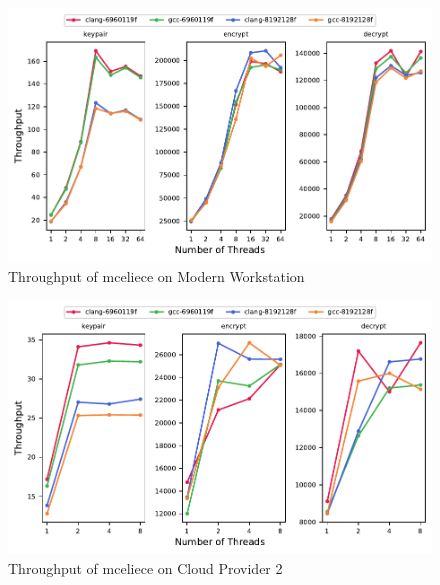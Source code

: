 \begin{figure}
    \centering
    \includegraphics[scale=0.75]{chapters/results/throughput/Modern Workstation_mceliece.pdf}
    \caption{Throughput of \gls{mceliece} on Modern Workstation}
    \label{figure:results:throughput:mceliece:modern-workstation}
\end{figure}

\begin{figure}
    \centering
    \includegraphics[scale=0.75]{chapters/results/throughput/Cloud Provider 2_mceliece.pdf}
    \caption{Throughput of \gls{mceliece} on Cloud Provider 2}
    \label{figure:results:throughput:mceliece:cloud-provider-2}
\end{figure}












